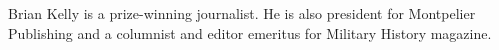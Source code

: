 Brian Kelly is a prize-winning journalist. He is also president for  Montpelier
Publishing and a columnist and editor emeritus for Military History magazine.  
